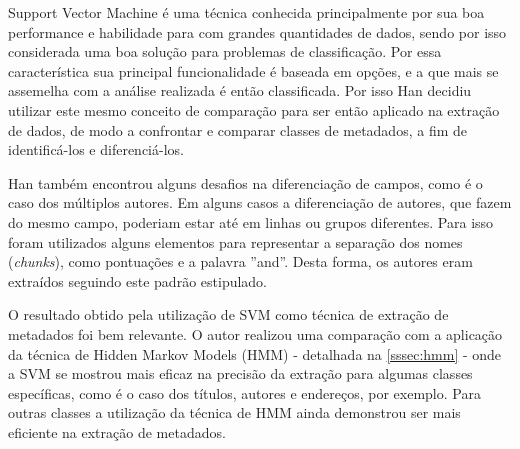\begin{textnew}
Support Vector Machine é uma técnica conhecida principalmente por sua boa performance e habilidade para com grandes quantidades de dados, sendo por isso considerada uma boa solução para problemas de classificação. Por essa característica sua principal funcionalidade é baseada em opções, e a que mais se assemelha com a análise realizada é então classificada. Por isso Han \cite{Han-SVM} decidiu utilizar este mesmo conceito de comparação para ser então aplicado na extração de dados, de modo a confrontar e comparar classes de metadados, a fim de identificá-los e diferenciá-los.

Han também encontrou alguns desafios na diferenciação de campos, como é o caso dos múltiplos autores. Em alguns casos a diferenciação de autores, que fazem do mesmo campo, poderiam estar até em linhas ou grupos diferentes. Para isso foram utilizados alguns elementos para representar a separação dos nomes (\textit{chunks}), como pontuações e a palavra ''and''. Desta forma, os autores eram extraídos seguindo este padrão estipulado.

O resultado obtido pela utilização de SVM como técnica de extração de metadados foi bem relevante. O autor realizou uma comparação com a aplicação da técnica de Hidden Markov Models (HMM) - detalhada na \autoref{sssec:hmm} - onde a SVM se mostrou mais eficaz na precisão da extração para algumas classes específicas, como é o caso dos títulos, autores e endereços, por exemplo. Para outras classes a utilização da técnica de HMM ainda demonstrou ser mais eficiente na extração de metadados.

\end{textnew}




